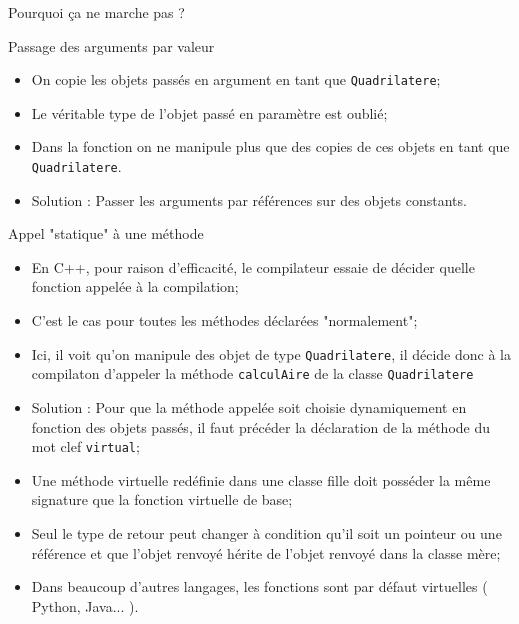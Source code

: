 \documentclass[handout,10pt]{beamer}
\begin{document}
\begin{frame}[fragile]{Pourquoi ça ne marche pas ?}
\tiny
\begin{block}{Passage des arguments par valeur}
\begin{itemize}
\item On copie les objets passés en argument en tant que \lstinline$Quadrilatere$;
\item Le véritable type de l'objet passé en paramètre est oublié;
\item Dans la fonction on ne manipule plus que des copies de ces objets en tant que \lstinline$Quadrilatere$.
\item {\color{blue}Solution} : Passer les arguments par références sur des objets constants.
\end{itemize}
\end{block}

\begin{block}{Appel "statique" à une méthode}
\begin{itemize}
\item En C++, pour raison d'efficacité, le compilateur essaie de décider quelle fonction appelée à la compilation;
\item C'est le cas pour toutes les méthodes déclarées "normalement";
\item Ici, il voit qu'on manipule des objet de type \lstinline$Quadrilatere$, il décide donc à la compilaton d'appeler la méthode \lstinline$calculAire$ de la classe \lstinline$Quadrilatere$
\item {\color{blue}Solution} : Pour que la méthode appelée soit choisie dynamiquement en fonction des objets passés, il faut précéder la déclaration de la méthode du mot clef \lstinline$virtual$;
\item Une méthode virtuelle redéfinie dans une classe fille doit posséder la même signature que la fonction virtuelle de base;
\item Seul le type de retour peut changer à condition qu'il soit un pointeur ou une référence et que l'objet renvoyé hérite de l'objet renvoyé
dans la classe mère;
\item Dans beaucoup d'autres langages, les fonctions sont par défaut virtuelles ( Python, Java... ).
\end{itemize}
\end{block}
\end{frame}
\end{document}
